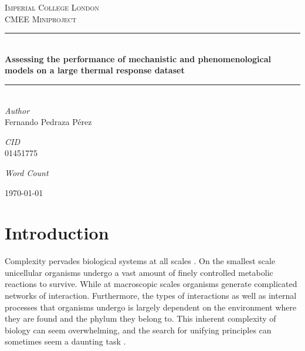 \documentclass[11pt]{article}  %
\begin{document}
 


\begin{titlepage}
	
	\newcommand{\HRule}{\rule{\linewidth}{0.5mm}} %
	\newcommand\wordcount{} %
	
	\center
	
	\textsc{\LARGE Imperial College London}\\[1.5cm] %
	
	\textsc{\Large CMEE Miniproject}\\[0.5 cm] %
	
	\HRule\\[0.4cm] %
	
	{\huge\bfseries Assessing the performance of mechanistic and phenomenological models on a large thermal response dataset}\\ [0.4 cm] %
	
	\HRule\\[1.5cm] %
	
	{\large\textit{Author}}\\ %
	Fernando Pedraza P\'erez
	
	\vfill
	
	{\large\textit{CID}}\\ %
	01451775
	
	
	\vfill
	
	{\large\textit{Word Count}}\\  %
	\wordcount 	 
	\vfill\vfil
	
	
	{\large\today}
	
	\vfill

\end{titlepage}

\newpage


\section*{Introduction}

Complexity pervades biological systems at all scales \cite{Levin}. On the smallest scale unicellular organisms undergo a vast amount of finely controlled metabolic reactions to survive. While at macroscopic scales organisms generate complicated networks of interaction. Furthermore, the types of interactions as well as internal processes that organisms undergo is largely dependent on the environment where they are found and the phylum they belong to. This inherent complexity of biology can seem overwhelming, and the search for unifying principles can sometimes seem a daunting task \cite{Margalef,Elgin}. 
\end{document}
